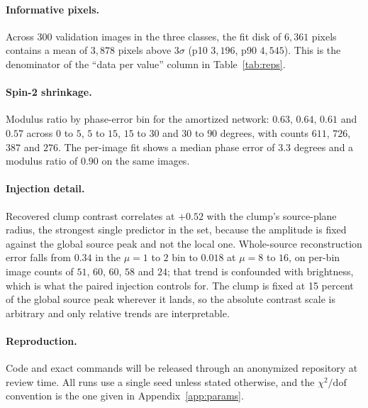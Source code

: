 \documentclass{article}
\begin{document}
\paragraph{Informative pixels.} Across 300 validation images in the three
classes, the fit disk of $6{,}361$ pixels contains a mean of $3{,}878$ pixels
above $3\sigma$ (p10 $3{,}196$, p90 $4{,}545$). This is the denominator of the
``data per value'' column in Table~\ref{tab:reps}.

\paragraph{Spin-2 shrinkage.} Modulus ratio by phase-error bin for the amortized
network: $0.63$, $0.64$, $0.61$ and $0.57$ across $0$ to $5$, $5$ to $15$, $15$
to $30$ and $30$ to $90$ degrees, with counts $611$, $726$, $387$ and $276$. The
per-image fit shows a median phase error of $3.3$ degrees and a modulus ratio of
$0.90$ on the same images.

\paragraph{Injection detail.} Recovered clump contrast correlates at $+0.52$ with
the clump's source-plane radius, the strongest single predictor in the set,
because the amplitude is fixed against the global source peak and not the local
one. Whole-source reconstruction error falls from
$0.34$ in the $\mu = 1$ to $2$ bin to $0.018$ at $\mu = 8$ to $16$, on per-bin
image counts of $51$, $60$, $60$, $58$ and $24$; that trend is confounded with
brightness, which is what the paired injection controls for. The clump is fixed
at 15 percent of the global source peak wherever it lands, so the absolute
contrast scale is arbitrary and only relative trends are interpretable.

\paragraph{Reproduction.} Code and exact commands will be released through an
anonymized repository at review time. All runs use a single seed unless stated
otherwise, and the $\chi^{2}/\mathrm{dof}$ convention is the one given in
Appendix~\ref{app:params}.

\end{document}
